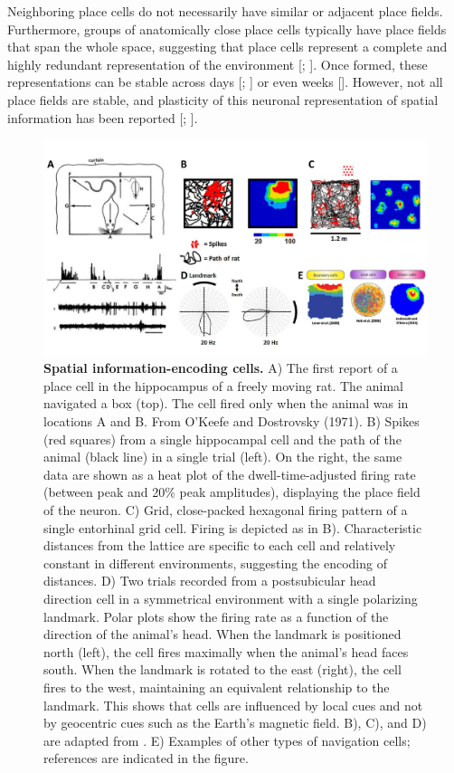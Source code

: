Neighboring place cells do not necessarily have similar or adjacent place fields. 
Furthermore, groups of anatomically close place cells typically have place fields that span the whole space, suggesting that place cells represent a complete and highly redundant representation of the environment [\cite{okeefe1976}; \cite{wilson1994}].
Once formed, these representations can be stable across days [\cite{hill1978}; \cite{muller1987}] or even weeks [\cite{thompson1990}].
However, not all place fields are stable, and plasticity of this neuronal representation of spatial information has been reported [\cite{mankin2015}; \cite{ziv2013}]. 
\begin{figure}
    \centering
    \includegraphics[width=\textwidth]{Figures/Chapter1/intro_fig_spatnav_cells.pdf}
    \caption[Spatial information-encoding cells]{\textbf{Spatial information-encoding cells.} 
    A) The first report of a place cell in the hippocampus of a freely moving rat. 
    The animal navigated a box (top). The cell fired only when the animal was in locations A and B. From O’Keefe and Dostrovsky (1971). 
    B) Spikes (red squares) from a single hippocampal cell and the path of the animal (black line) in a single trial (left). 
    On the right, the same data are shown as a heat plot of the dwell-time-adjusted firing rate (between peak and 20\% peak amplitudes), displaying the place field of the neuron. 
    C) Grid, close-packed hexagonal firing pattern of a single entorhinal grid cell. 
    Firing is depicted as in B). 
    Characteristic distances from the lattice are specific to each cell and relatively constant in different environments, suggesting the encoding of distances. 
    D) Two trials recorded from a postsubicular head direction cell in a symmetrical environment with a single polarizing landmark. 
    Polar plots show the firing rate as a function of the direction of the animal's head. 
    When the landmark is positioned north (left), the cell fires maximally when the animal's head faces south. 
    When the landmark is rotated to the east (right), the cell fires to the west, maintaining an equivalent relationship to the landmark. 
    This shows that cells are influenced by local cues and not by geocentric cues such as the Earth’s magnetic field. 
    B), C), and D) are adapted from \cite{grieves2017}. 
    E) Examples of other types of navigation cells; references are indicated in the figure.}
    \label{fig:chap1:spatialnavigationcells}
\end{figure}

